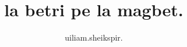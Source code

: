 \documentclass{book}
\title{la betri pe la magbet.}
\author{uiliam.sheikspir.}
\begin{document}
\setlength{\parindent}{0in}
\maketitle


\def\lojnamcu#1{\ifcase#1 no\or pa\or re\or ci\or vo\or mu\or
	xa\or se\or bi\or so\fi}
\def\moho#1{\lojnamcu#1mo'o}
\def\moi#1{\lojnamcu#1moi}

\newcommand{\act}{\part{}}
\newcommand{\scene}[1]{\chapter{#1}}
\renewcommand{\partname}{}%
\renewcommand{\chaptername}{}
\makeatletter
\renewcommand{\thepart}{\moho{\c@part} draci}
\renewcommand{\thechapter}{\lojnamcu{\c@part}pi'e\moho{\c@chapter} jvinu}
\makeatother

\newcommand{\stagedir}[1]{\textit{#1}}
\newcommand{\exeunt}{\stagedir{Exeunt.}}

\newcommand{\speak}[2]{%
	\begin{center}\MakeUppercase{#1}\end{center}
	\begin{quote}#2\end{quote}
}







\end{document}
